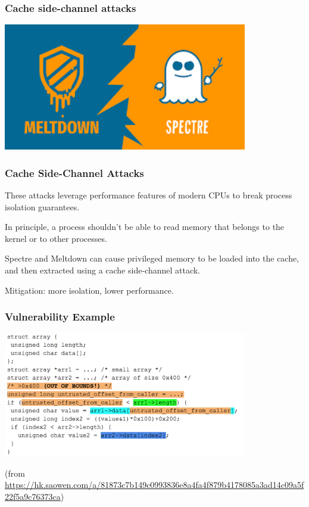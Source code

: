 \begin{frame}
\frametitle{Cache side-channel attacks}

\begin{center}
\includegraphics[width=0.8\textwidth]{images/meltdown-spectre.png}
\end{center}


\end{frame}

\begin{frame}
\frametitle{Cache Side-Channel Attacks}

These attacks leverage performance features of modern CPUs to break process isolation guarantees.

In principle, a process shouldn't be able to read memory that belongs to the kernel or to other processes.

Spectre and Meltdown can cause privileged memory to be loaded into the cache, and then extracted using a cache side-channel attack.

Mitigation: more isolation, lower performance.

\end{frame}



\begin{frame}
\frametitle{Vulnerability Example}

\begin{center}
\includegraphics[width=0.8\textwidth]{images/cache-sidechannel1.png}
\end{center}
\tiny (from \url{https://hk.saowen.com/a/81873c7b149c0993836e8a4fa4f879b4178085a3ad14c09a5f22f5a9c76373ca})

\end{frame}

